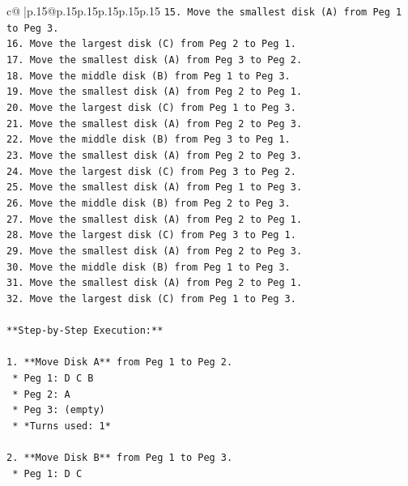 \documentclass{article}
\begin{document}
{\begin{supertabular}{c@{$\;$}|p{.15\linewidth}@{}p{.15\linewidth}p{.15\linewidth}p{.15\linewidth}p{.15\linewidth}p{.15\linewidth}}
{{{\texttt{15. Move the smallest disk (A) from Peg 1 to Peg 3.} \\
\texttt{16. Move the largest disk (C) from Peg 2 to Peg 1.} \\
\texttt{17. Move the smallest disk (A) from Peg 3 to Peg 2.} \\
\texttt{18. Move the middle disk (B) from Peg 1 to Peg 3.} \\
\texttt{19. Move the smallest disk (A) from Peg 2 to Peg 1.} \\
\texttt{20. Move the largest disk (C) from Peg 1 to Peg 3.} \\
\texttt{21. Move the smallest disk (A) from Peg 2 to Peg 3.} \\
\texttt{22. Move the middle disk (B) from Peg 3 to Peg 1.} \\
\texttt{23. Move the smallest disk (A) from Peg 2 to Peg 3.} \\
\texttt{24. Move the largest disk (C) from Peg 3 to Peg 2.} \\
\texttt{25. Move the smallest disk (A) from Peg 1 to Peg 3.} \\
\texttt{26. Move the middle disk (B) from Peg 2 to Peg 3.} \\
\texttt{27. Move the smallest disk (A) from Peg 2 to Peg 1.} \\
\texttt{28. Move the largest disk (C) from Peg 3 to Peg 1.} \\
\texttt{29. Move the smallest disk (A) from Peg 2 to Peg 3.} \\
\texttt{30. Move the middle disk (B) from Peg 1 to Peg 3.} \\
\texttt{31. Move the smallest disk (A) from Peg 2 to Peg 1.} \\
\texttt{32. Move the largest disk (C) from Peg 1 to Peg 3.} \\
\\ 
\texttt{**Step{-}by{-}Step Execution:**} \\
\\ 
\texttt{1.  **Move Disk A** from Peg 1 to Peg 2.} \\
\texttt{    *   Peg 1: D C B} \\
\texttt{    *   Peg 2: A} \\
\texttt{    *   Peg 3: (empty)} \\
\texttt{    *   *Turns used: 1*} \\
\\ 
\texttt{2.  **Move Disk B** from Peg 1 to Peg 3.} \\
\texttt{    *   Peg 1: D C} \\
}}}
\end{supertabular}}
\end{document}
